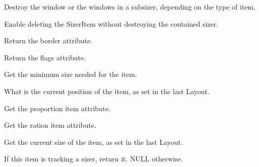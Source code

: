 Destroy the window or the windows in a subsizer, depending on the type
of item.


\label{wxsizeritemdetachsizer}


Enable deleting the SizerItem without destroying the contained sizer.


\label{wxsizeritemgetborder}


Return the border attribute.

\label{wxsizeritemgetflag}


Return the flags attribute.


\label{wxsizeritemgetminsize}


Get the minimum size needed for the item.

\label{wxsizeritemgetposition}


What is the current position of the item, as set in the last Layout.

\label{wxsizeritemgetproportion}


Get the proportion item attribute.

\label{wxsizeritemgetratio}


Get the ration item attribute.

\label{wxsizeritemgetsize}


Get the current size of the item, as set in the last Layout.

\label{wxsizeritemgetsizer}


If this item is tracking a sizer, return it.  NULL otherwise.


\label{wxsizeritemgetspacer}

